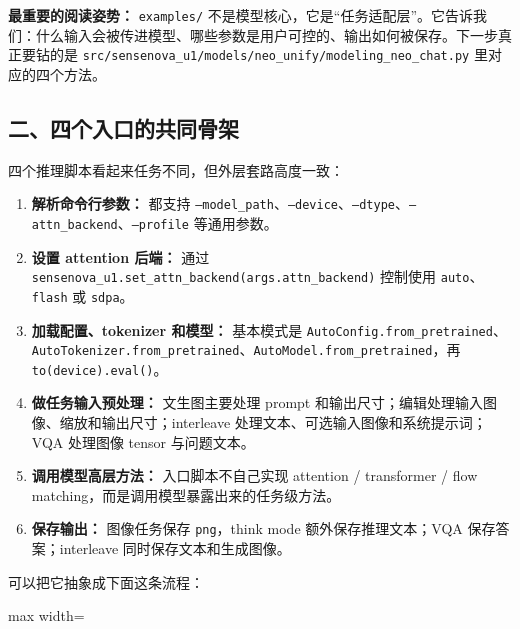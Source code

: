 \begin{intubox}
\textbf{最重要的阅读姿势：} \texttt{examples/} 不是模型核心，它是“任务适配层”。它告诉我们：什么输入会被传进模型、哪些参数是用户可控的、输出如何被保存。下一步真正要钻的是 \texttt{src/sensenova\_u1/models/neo\_unify/modeling\_neo\_chat.py} 里对应的四个方法。
\end{intubox}

\subsection{二、四个入口的共同骨架}

四个推理脚本看起来任务不同，但外层套路高度一致：

\begin{enumerate}[leftmargin=1.8em]
  \item \textbf{解析命令行参数：} 都支持 \texttt{--model\_path}、\texttt{--device}、\texttt{--dtype}、\texttt{--attn\_backend}、\texttt{--profile} 等通用参数。
  \item \textbf{设置 attention 后端：} 通过 \texttt{sensenova\_u1.set\_attn\_backend(args.attn\_backend)} 控制使用 \texttt{auto}、\texttt{flash} 或 \texttt{sdpa}。
  \item \textbf{加载配置、tokenizer 和模型：} 基本模式是 \texttt{AutoConfig.from\_pretrained}、\texttt{AutoTokenizer.from\_pretrained}、\texttt{AutoModel.from\_pretrained}，再 \texttt{to(device).eval()}。
  \item \textbf{做任务输入预处理：} 文生图主要处理 prompt 和输出尺寸；编辑处理输入图像、缩放和输出尺寸；interleave 处理文本、可选输入图像和系统提示词；VQA 处理图像 tensor 与问题文本。
  \item \textbf{调用模型高层方法：} 入口脚本不自己实现 attention / transformer / flow matching，而是调用模型暴露出来的任务级方法。
  \item \textbf{保存输出：} 图像任务保存 \texttt{png}，think mode 额外保存推理文本；VQA 保存答案；interleave 同时保存文本和生成图像。
\end{enumerate}

可以把它抽象成下面这条流程：

\begin{center}
\begin{adjustbox}{max width=\linewidth}
\end{adjustbox}
\end{center}

